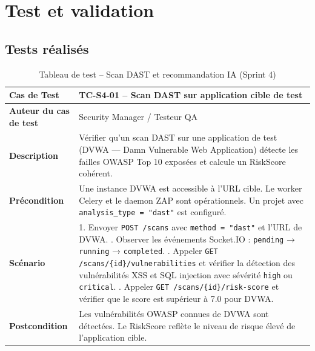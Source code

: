 \section{Test et validation}

\subsection{Tests réalisés}

\begin{table}[H]
\centering
\caption{Tableau de test -- Scan DAST et recommandation IA (Sprint 4)}
\label{tab:test-sprint4}
\small
\renewcommand{\arraystretch}{1.3}
\begin{tabularx}{\textwidth}{>{\bfseries}p{3.5cm} X}
\hline
Cas de Test & TC-S4-01 -- Scan DAST sur application cible de test \\
\hline
Auteur du cas de test & Security Manager / Testeur QA \\
\hline
Description & Vérifier qu'un scan DAST sur une application de test (DVWA — Damn Vulnerable Web Application) détecte les failles OWASP Top 10 exposées et calcule un RiskScore cohérent. \\
\hline
Précondition & Une instance DVWA est accessible à l'URL cible. Le worker Celery et le daemon ZAP sont opérationnels. Un projet avec \texttt{analysis\_type = "dast"} est configuré. \\
\hline
Scénario &
1. Envoyer \texttt{POST /scans} avec \texttt{method = "dast"} et l'URL de DVWA. \newline
2. Observer les événements Socket.IO : \texttt{pending} → \texttt{running} → \texttt{completed}. \newline
3. Appeler \texttt{GET /scans/\{id\}/vulnerabilities} et vérifier la détection des vulnérabilités XSS et SQL injection avec sévérité \texttt{high} ou \texttt{critical}. \newline
4. Appeler \texttt{GET /scans/\{id\}/risk-score} et vérifier que le score est supérieur à 7.0 pour DVWA. \\
\hline
Postcondition & Les vulnérabilités OWASP connues de DVWA sont détectées. Le RiskScore reflète le niveau de risque élevé de l'application cible. \\
\hline
\end{tabularx}
\end{table}


